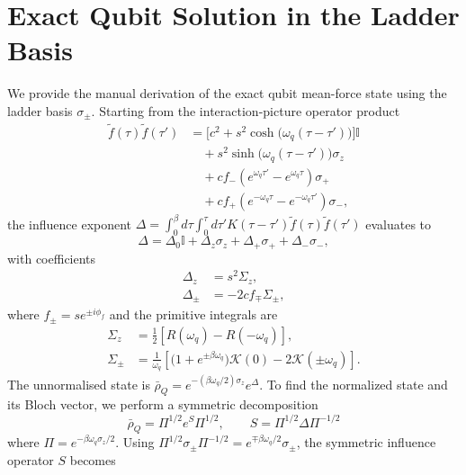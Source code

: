 \section{Exact Qubit Solution in the Ladder Basis}
\label{app:qubit_ladder_derivation}

We provide the manual derivation of the exact qubit mean-force state using the ladder basis $\sigma_\pm$. Starting from the interaction-picture operator product
\begin{equation}
\begin{aligned}
    \tilde{f}(\tau)\tilde{f}(\tau')
    &= \Big[c^2 + s^2\cosh\big(\omega_q(\tau-\tau')\big)\Big]\mathbb{I} \\
    &\quad + s^2\sinh\big(\omega_q(\tau-\tau')\big)\sigma_z \\
    &\quad + c f_- \left(e^{\omega_q\tau'} - e^{\omega_q\tau}\right)\sigma_+ \\
    &\quad + c f_+ \left(e^{-\omega_q\tau} - e^{-\omega_q\tau'}\right)\sigma_-,
\end{aligned}
\end{equation}
the influence exponent $\Delta = \int_0^\beta d\tau \int_0^\tau d\tau' K(\tau-\tau') \tilde{f}(\tau)\tilde{f}(\tau')$ evaluates to
\begin{equation}
    \Delta = \Delta_0 \mathbb{I} + \Delta_z \sigma_z + \Delta_+ \sigma_+ + \Delta_- \sigma_-,
\end{equation}
with coefficients
\begin{align}
    \Delta_z &= s^2 \Sigma_z, \\
    \Delta_\pm &= -2 c f_\mp \Sigma_\pm,
\end{align}
where $f_\pm = s e^{\pm i \phi_f}$ and the primitive integrals are
\begin{align}
    \Sigma_z &= \frac{1}{2}\left[R(\omega_q) - R(-\omega_q)\right], \\
    \Sigma_\pm &= \frac{1}{\omega_q} \left[\big(1 + e^{\pm\beta\omega_q}\big)\mathcal{K}(0) - 2\mathcal{K}(\pm\omega_q)\right].
\end{align}
The unnormalised state is $\bar\rho_Q = e^{-(\beta\omega_q/2) \sigma_z} e^\Delta$. To find the normalized state and its Bloch vector, we perform a symmetric decomposition
\begin{equation}
    \bar\rho_Q = \Pi^{1/2} e^S \Pi^{1/2}, \qquad S = \Pi^{1/2} \Delta \Pi^{-1/2}
\end{equation}
where $\Pi = e^{-\beta \omega_q \sigma_z / 2}$. Using $\Pi^{1/2} \sigma_\pm \Pi^{-1/2} = e^{\mp \beta\omega_q/2} \sigma_\pm$, the symmetric influence operator $S$ becomes
